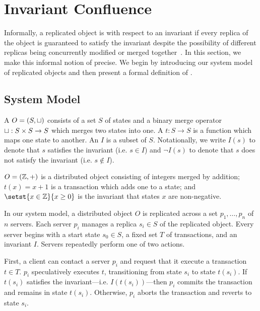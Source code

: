 \section{Invariant Confluence}
Informally, a replicated object is  with respect
to an invariant if every replica of the object is guaranteed to satisfy the
invariant despite the possibility of different replicas being concurrently
modified or merged together~\cite{bailis2014coordination}. In this section, we
make this informal notion of \invariantconfluence{} precise. We begin by
introducing our system model of replicated objects and then present a formal
definition of \invariantconfluence{}.

\subsection{System Model}
A  $O = (S, \sqcup)$ consists of a set $S$ of states
and a binary merge operator $\sqcup: S \times S \to S$ which merges two states
into one. A  $t: S \to S$ is a function which maps one
state to another. An  $I$ is a subset of $S$.  Notationally,
we write $I(s)$ to denote that $s$ satisfies the invariant (i.e.  $s \in I$)
and $\lnot I(s)$ to denote that $s$ does not satisfy the invariant (i.e. $s
\notin I$).

\begin{example}
  $O = (\mathbb{Z}, +)$ is a distributed object consisting of integers merged by
  addition; $t(x) = x + 1$ is a transaction which adds one to a state; and
  $\setst{x \in \ints}{x \geq 0}$ is the invariant that states $x$ are
  non-negative.
\end{example}

In our system model, a distributed object $O$ is replicated across a set $p_1,
\ldots, p_n$ of $n$ servers. Each server $p_i$ manages a replica $s_i \in S$ of
the replicated object. Every server begins with a start state $s_0 \in S$, a
fixed set $T$ of transactions, and an invariant $I$. Servers repeatedly perform
one of two actions.

First, a client can contact a server $p_i$ and request that it execute a
transaction $t \in T$. $p_i$ speculatively executes $t$, transitioning from
state $s_i$ to state $t(s_i)$. If $t(s_i)$ satisfies the invariant---i.e.
$I(t(s_i))$---then $p_i$ commits the transaction and remains in state $t(s_i)$.
Otherwise, $p_i$ aborts the transaction and reverts to state $s_i$.

